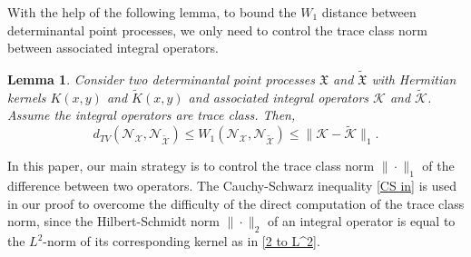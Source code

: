 \documentclass[11pt]{article}
\newtheorem{lemma}[theorem]{Lemma}
\numberwithin{equation}{section}%
\numberwithin{theorem}{section}
\begin{document}
With the help of the following lemma, to bound the $W_1$ distance between determinantal point processes, we only need to control the trace class norm between associated integral operators.  
\begin{lemma}
	\label{M and M}{\rm\cite[Lemma $1.1$]{cai2025microscopicratesconvergencehermitian}}
	Consider two determinantal point processes $\mathfrak{X}$ and $\widetilde{\mathfrak{X}}$ with Hermitian kernels $K(x,y)$ and $\widetilde{K}(x,y)$ and associated integral operators $\mathcal{K}$ and $\widetilde{\mathcal{K}}$. Assume the integral operators are trace class. Then,
	\begin{equation*}
	d_{TV}(\mathcal{N}_{\mathcal{X}},\mathcal{N}_{\tilde{\mathcal{X}}}) 
	\leq W_1(\mathcal{N}_\mathcal{X},\mathcal{N}_{\tilde{\mathcal{X}}})
	\leq \lVert \mathcal{K} - \widetilde{\mathcal{K}} \rVert_1.
	\end{equation*}
\end{lemma}
In this paper, our main strategy is to control the trace class norm $\|\cdot\|_1$ of the difference between two operators. The Cauchy-Schwarz inequality \eqref{CS in} is used in our proof to overcome the difficulty of the direct computation of the trace class norm, since the Hilbert-Schmidt norm $\|\cdot\|_2$ of an integral operator is equal to the $L^2$-norm of its corresponding kernel as in \eqref{2 to L^2}. 
\end{document}
